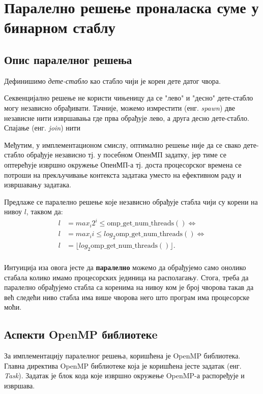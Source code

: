\section{Паралелно решење проналаска суме у бинарном стаблу}

\subsection{Опис паралелног решења}
Дефинишимо \textit{дете-стабло} као стабло чији је корен дете датог чвора.

Секвенцијално решење не користи чињеницу да се "лево" и "десно" дете-стабло могу независно обрађивати.
Тачније, можемо измрестити (енг. \textit{spawn}) две независне нити извршавања где прва обрађује лево, а друга десно дете-стабло.
Спајање (енг. \textit{join}) нити 

Међутим, у имплементационом смислу, оптимално решење није да се свако дете-стабло обрађује независно тј.
у посебном ОпенМП задатку, јер тиме се оптерећује извршно окружење ОпенМП-а тј. доста процесорског времена
се потроши на прекључивање контекста задатака уместо на ефективном раду и извршавању задатака.

Предлаже се паралелно решење које независно обрађује стабла чији су корени на нивоу $l$, таквом да:
\begin{equation}
\begin{split}
    l &= max_i 2^i \leq \mathrm{omp\_get\_num\_threads()} \iff \\
    l &= max_i i \leq log_2 \mathrm{omp\_get\_num\_threads()} \iff \\
    l &= \lfloor log_2 \mathrm{omp\_get\_num\_threads()} \rfloor .\\
\end{split}
\end{equation}

Интуиција иза овога јесте да \textbf{паралелно} можемо да обрађујемо само онолико стабала колико имамо процесорских јединица на располагању.
Стога, треба да паралелно обрађујемо стабла са коренима на нивоу ком је број чворова такав да већ следећи ниво стабла има више чворова него
што програм има процесорске моћи.

\subsection{Аспекти OpenMP библиотекe}
\label{popravljena}

За имплементацију паралелног решења, коришћена је OpenMP библиотека.
Главна директива OpenMP библиотеке која је коришћена јесте задатак (енг. \textit{Task}).
Задатак је блок кода које извршно окружење OpenMP-а распоређује и извршава.


